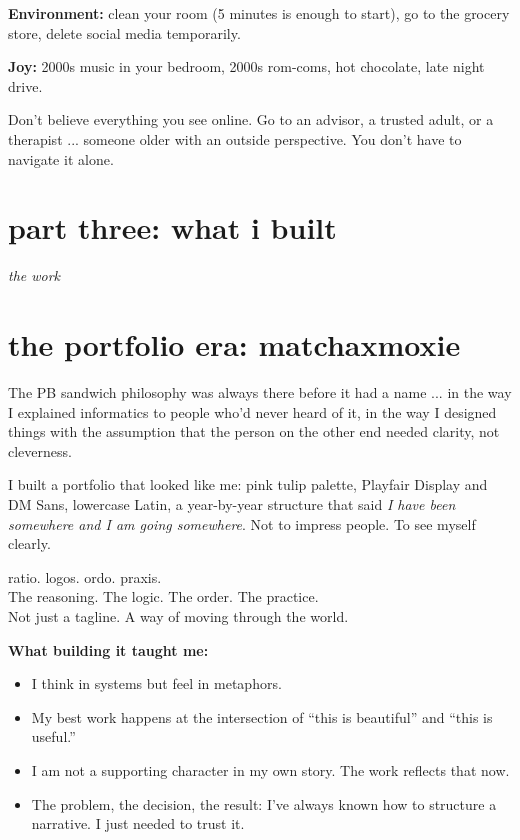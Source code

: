 \documentclass[12pt, letterpaper]{article}
\newenvironment{jadequote}{%
  \begin{mdframed}[backgroundcolor=soft, linecolor=moxie, linewidth=1pt,
    innerleftmargin=10pt, innerrightmargin=10pt,
    innertopmargin=8pt, innerbottommargin=8pt]
  \itshape
}{%
  \end{mdframed}
}
\begin{document}
\textbf{Environment:} clean your room (5 minutes is enough to start), go to the grocery store, delete social media temporarily.

\textbf{Joy:} 2000s music in your bedroom, 2000s rom-coms, hot chocolate, late night drive.

\begin{jadequote}
Don't believe everything you see online. Go to an advisor, a trusted adult, or a therapist ... someone older with an outside perspective. You don't have to navigate it alone.
\end{jadequote}

\newpage
\section*{\color{matcha} part three: what i built}
\vspace{-0.5em}
{\small\color{gray}\itshape the work}
\vspace{1em}

\section{the portfolio era: matchaxmoxie}

The PB sandwich philosophy was always there before it had a name ... in the way I explained informatics to people who'd never heard of it, in the way I designed things with the assumption that the person on the other end needed clarity, not cleverness.

I built a portfolio that looked like me: pink tulip palette, Playfair Display and DM Sans, lowercase Latin, a year-by-year structure that said \textit{I have been somewhere and I am going somewhere}. Not to impress people. To see myself clearly.

\begin{jadequote}
ratio. logos. ordo. praxis.\\[0.3em]
The reasoning. The logic. The order. The practice.\\
Not just a tagline. A way of moving through the world.
\end{jadequote}

\textbf{What building it taught me:}
\begin{itemize}
  \item I think in systems but feel in metaphors.
  \item My best work happens at the intersection of ``this is beautiful'' and ``this is useful.''
  \item I am not a supporting character in my own story. The work reflects that now.
  \item The problem, the decision, the result: I've always known how to structure a narrative. I just needed to trust it.
\end{itemize}
\end{document}
